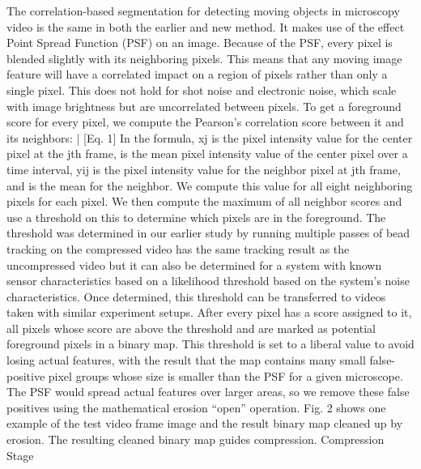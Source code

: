 The correlation-based segmentation for detecting moving objects in microscopy video is the same in both the earlier and new method. It makes use of the effect Point Spread Function (PSF) on an image. Because of the PSF, every pixel is blended slightly with its neighboring pixels.  This means that any moving image feature will have a correlated impact on a region of pixels rather than only a single pixel. This does not hold for shot noise and electronic noise, which scale with image brightness but are uncorrelated between pixels. To get a foreground score for every pixel, we compute the Pearson’s correlation score between it and its neighbors:
 |    [Eq. 1]
In the formula, xj is the pixel intensity value for the center pixel at the jth frame,  is the mean pixel intensity value of the center pixel over a time interval, yij is the pixel intensity value for the neighbor pixel at jth frame, and  is the mean for the neighbor.
We compute this value for all eight neighboring pixels for each pixel. We then compute the maximum of all neighbor scores and use a threshold on this to determine which pixels are in the foreground. The threshold was determined in our earlier study by running multiple passes of bead tracking on the compressed video has the same tracking result as the uncompressed video but it can also be determined for a system with known sensor characteristics based on a likelihood threshold based on the system’s noise characteristics. Once determined, this threshold can be transferred to videos taken with similar experiment setups. After every pixel has a score assigned to it, all pixels whose score are above the threshold and are marked as potential foreground pixels in a binary map. This threshold is set to a liberal value to avoid losing actual features, with the result that the map contains many small false-positive pixel groups whose size is smaller than the PSF for a given microscope. The PSF would spread actual features over larger areas, so we remove these false positives using the mathematical erosion “open” operation. Fig. 2 shows one example of the test video frame image and the result binary map cleaned up by erosion. The resulting cleaned binary map guides compression.
Compression Stage

